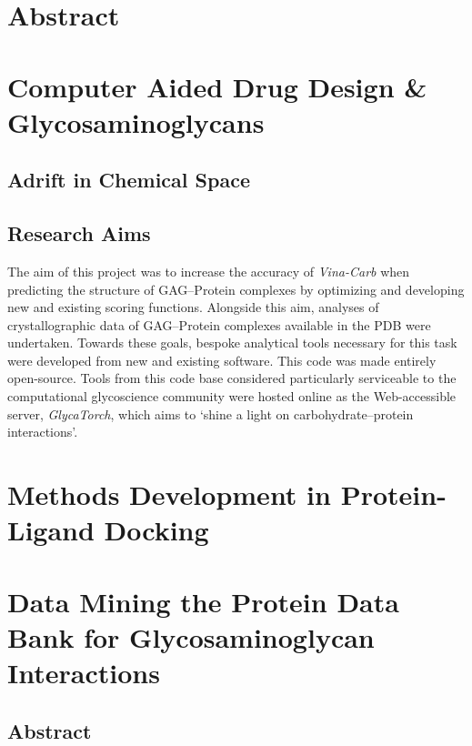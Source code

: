 \documentclass[a4paper, 12pt, openany]{book}
\begin{document}
\pagebreak
{} 

\chapter*{Abstract}

\newpage

\chapter{Computer Aided Drug Design \& Glycosaminoglycans}
\section{Adrift in Chemical Space}

\newpage
\section{Research Aims}
{
The aim of this project was to increase the accuracy of \textit{Vina-Carb} when predicting the structure of \acs{GAG}--Protein complexes by optimizing and developing new and existing scoring functions.
Alongside this aim, analyses of crystallographic data of \acs{GAG}--Protein complexes available in the \ac{PDB} were undertaken. 
Towards these goals, bespoke analytical tools necessary for this task were developed from new and existing software. This code was made entirely open-source. 
Tools from this code base considered particularly serviceable to the computational glycoscience community were hosted online as the Web-accessible server, \textit{GlycaTorch}, which aims to `shine a light on carbohydrate--protein interactions'.
}

\chapter{Methods Development in Protein-Ligand Docking}

\chapter{Data Mining the Protein Data Bank for Glycosaminoglycan Interactions}
\section{Abstract}
\end{document}

